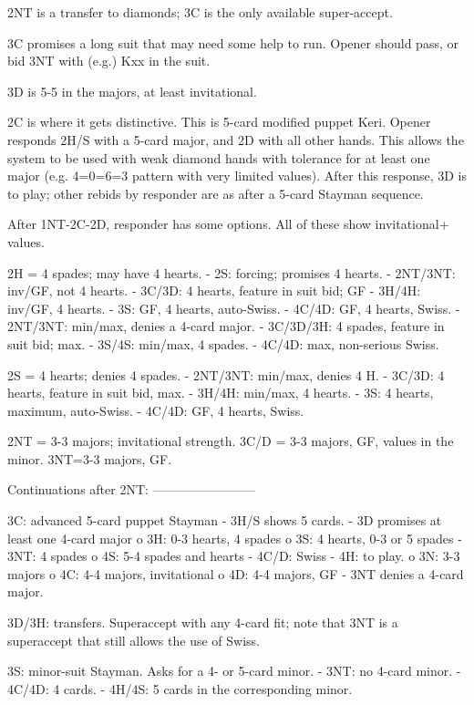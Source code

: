 2NT is a transfer to diamonds; 3C is the only available super-accept.

3C promises a long suit that may need some help to run.  Opener should
pass, or bid 3NT with (e.g.) Kxx in the suit.

3D is 5-5 in the majors, at least invitational.

2C is where it gets distinctive.  This is 5-card modified puppet Keri.
Opener responds 2H/S with a 5-card major, and 2D with all other hands. 
This allows the system to be used with weak diamond hands with tolerance
for at least one major (e.g. 4=0=6=3 pattern with very limited values).
After this response, 3D is to play; other rebids by responder are as after
a 5-card Stayman sequence.

After 1NT-2C-2D, responder has some options.  All of these show
invitational+ values.

2H = 4 spades; may have 4 hearts.
   - 2S: forcing; promises 4 hearts.
      - 2NT/3NT: inv/GF, not 4 hearts.
      - 3C/3D: 4 hearts, feature in suit bid; GF
      - 3H/4H: inv/GF, 4 hearts.
      - 3S: GF, 4 hearts, auto-Swiss.
      - 4C/4D: GF, 4 hearts, Swiss.
   - 2NT/3NT: min/max, denies a 4-card major.
   - 3C/3D/3H: 4 spades, feature in suit bid; max.
   - 3S/4S: min/max, 4 spades.
   - 4C/4D: max, non-serious Swiss.

2S = 4 hearts; denies 4 spades.
   - 2NT/3NT: min/max, denies 4 H.
   - 3C/3D: 4 hearts, feature in suit bid, max.
   - 3H/4H: min/max, 4 hearts.
   - 3S: 4 hearts, maximum, auto-Swiss.
   - 4C/4D: GF, 4 hearts, Swiss.

2NT = 3-3 majors; invitational strength.
3C/D = 3-3 majors, GF, values in the minor.
3NT=3-3 majors, GF.

Continuations after 2NT:
------------------------

3C: advanced 5-card puppet Stayman
   - 3H/S shows 5 cards.
   - 3D promises at least one 4-card major
      o 3H: 0-3 hearts, 4 spades
      o 3S: 4 hearts, 0-3 or 5 spades
         - 3NT: 4 spades
            o 4S: 5-4 spades and hearts
         - 4C/D: Swiss
         - 4H: to play.
      o 3N: 3-3 majors
      o 4C: 4-4 majors, invitational
      o 4D: 4-4 majors, GF
   - 3NT denies a 4-card major.

3D/3H: transfers.  Superaccept with any 4-card fit; note that 3NT is a
superaccept that still allows the use of Swiss.

3S: minor-suit Stayman.  Asks for a 4- or 5-card minor.
   - 3NT: no 4-card minor.
   - 4C/4D: 4 cards.
   - 4H/4S: 5 cards in the corresponding minor.

